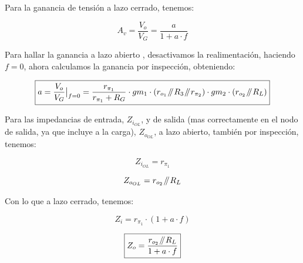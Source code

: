 Para la ganancia de tensión a lazo cerrado, tenemos:

\begin{equation}
A_{v} = \frac{V_{o}}{V_{G}} = \frac{a}{1 + a \cdot f}
\end{equation}


Para hallar la ganancia a lazo abierto , desactivamos la realimentación, haciendo $f = 0$, ahora calculamos la ganancia por inspección, obteniendo:

\begin{equation}
\boxed{ a = \evalat{\frac{V_{o}}{V_{G}}}{f=0} = \frac{r_{\pi_{1}}}{r_{\pi_{1}} + R_{G}} \cdot gm_{1} \cdot \left( r_{o_{1}} \parallelresistors R_{3} \parallelresistors r_{\pi_{2}} \right) \cdot gm_{2} \cdot \left( r_{o_{2}} \parallelresistors R_{L} \right) }
\end{equation}

Para las impedancias de entrada, $Z_{i_{OL}}$, y de salida (mas correctamente en el nodo de salida, ya que incluye a la carga), $Z_{o_{OL}}$, a lazo abierto, también por inspección, tenemos:

\begin{equation}
Z_{i_{OL}} = r_{\pi_{1}}
\end{equation}

\begin{equation}
Z_{o_{OL}} = r_{o_{2}} \mathbin{\!/\mkern-5mu/\!} R_{L}
\end{equation}

Con lo que a lazo cerrado, tenemos:

\begin{equation}
\boxed{ Z_{i} = r_{\pi_{1}} \cdot \left( 1 + a \cdot f \right)}
\end{equation}

\begin{equation}
\boxed{ Z_{o} = \frac{ r_{o_{2}} \mathbin{\!/\mkern-5mu/\!} R_{L} }{1 + a \cdot f} }
\end{equation}


\clearpage